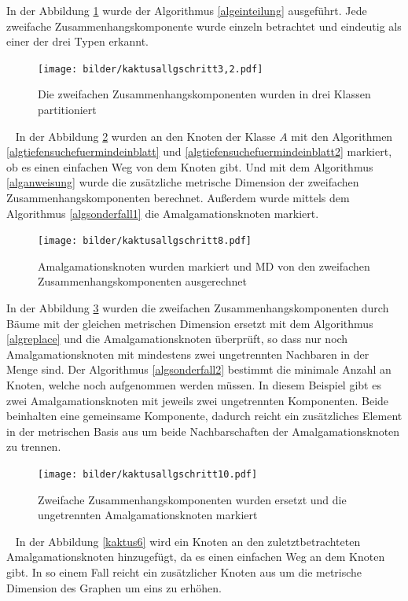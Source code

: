 \begin{bsp}
  	 In der Abbildung \ref{kaktus1.2} wurde der Algorithmus \ref{algeinteilung} ausgeführt. Jede zweifache Zusammenhangskomponente wurde einzeln betrachtet und eindeutig als einer der drei Typen erkannt.
 	   	 \begin{figure}[h!]
		\centering
 		 \texttt{[image: bilder/kaktusallgschritt3,2.pdf]}
   \caption{Die zweifachen Zusammenhangskomponenten wurden in drei Klassen partitioniert}
      \label{kaktus1.2}
  	 \end{figure}
  	 ~\linebreak
 In der Abbildung \ref{kaktus2} wurden an den Knoten der Klasse $A$ mit den Algorithmen \ref{algtiefensuchefuermindeinblatt} und \ref{algtiefensuchefuermindeinblatt2} markiert, ob es einen einfachen Weg von dem Knoten gibt. Und mit dem Algorithmus \ref{alganweisung} wurde die zusätzliche metrische Dimension der zweifachen Zusammenhangskomponenten berechnet. Außerdem wurde mittels dem Algorithmus \ref{algsonderfall1} die Amalgamationsknoten markiert.
  	   	  	   	 \begin{figure}[h!]
		\centering
 		 \texttt{[image: bilder/kaktusallgschritt8.pdf]}
   \caption{Amalgamationsknoten wurden markiert und MD von den zweifachen Zusammenhangskomponenten ausgerechnet}
\label{kaktus2}  	
  	 \end{figure}
  	 \newpage
  	 In der Abbildung \ref{kaktus4} wurden die zweifachen Zusammenhangskomponenten durch Bäume mit der gleichen metrischen Dimension ersetzt mit dem Algorithmus \ref{algreplace} und die Amalgamationsknoten überprüft, so dass nur noch Amalgamationsknoten mit mindestens zwei ungetrennten Nachbaren in der Menge sind. Der Algorithmus \ref{algsonderfall2} bestimmt die minimale Anzahl an Knoten, welche noch aufgenommen werden müssen. In diesem Beispiel gibt es zwei Amalgamationsknoten mit jeweils zwei ungetrennten Komponenten. Beide beinhalten eine gemeinsame Komponente, dadurch reicht ein zusätzliches Element in der metrischen Basis aus um beide Nachbarschaften der Amalgamationsknoten zu trennen.
\vspace{-1mm}
  	   	 \begin{figure}[h!]
		\centering
 		 \texttt{[image: bilder/kaktusallgschritt10.pdf]}
   \caption{Zweifache Zusammenhangskomponenten wurden ersetzt und die ungetrennten Amalgamationsknoten markiert}
   \label{kaktus4}
  	 \end{figure}
  	 \vspace{-3mm}
  	 ~\linebreak
  	 In der Abbildung \ref{kaktus6} wird ein Knoten an den zuletztbetrachteten Amalgamationsknoten hinzugefügt, da es einen einfachen Weg an dem Knoten gibt. In so einem Fall reicht ein zusätzlicher Knoten aus um die metrische Dimension des Graphen um eins zu erhöhen.

\end{bsp}
